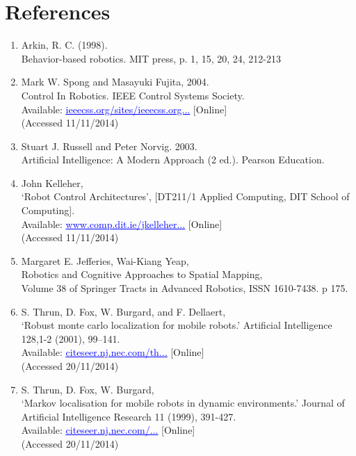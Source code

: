 \documentclass{article}
\begin{document}
\section{References}
\begin{enumerate}

\item Arkin, R. C. (1998).
\\Behavior-based robotics. MIT press, p. 1, 15, 20, 24, 212-213

\item Mark W. Spong and Masayuki Fujita, 2004.
\\Control In Robotics. IEEE Control Systems Society. \\Available: \href{ieeecss.org/sites/ieeecss.org/files/documents/IoCT-Part1-04Robotics.pdf}{\textcolor{blue}{\uline{ieeecss.org/sites/ieeecss.org...}}} [Online]
\\(Accessed 11/11/2014)

\item Stuart J. Russell and Peter Norvig. 2003.
\\Artificial Intelligence: A Modern Approach (2 ed.). Pearson Education.

\item John Kelleher,
\\‘Robot Control Architectures’,  [DT211/1 Applied Computing, DIT School of Computing].
\\Available: \href{www.comp.dit.ie/jkelleher/appliedcomputing/week8/RCA.pdf}{\textcolor{blue}{\uline{www.comp.dit.ie/jkelleher...}}} [Online]
\\(Accessed 11/11/2014)

\item Margaret E. Jefferies, Wai-Kiang Yeap,
\\Robotics and Cognitive Approaches to Spatial Mapping,
\\Volume 38 of Springer Tracts in Advanced Robotics, ISSN 1610-7438. p 175.

\item S. Thrun, D. Fox, W. Burgard, and F. Dellaert,
\\‘Robust monte carlo localization for mobile robots.’ Artificial Intelligence 128,1-2 (2001), 99–141.
\\Available: \href{citeseer.nj.nec.com/thrun01robust.html}{\textcolor{blue}{\uline{citeseer.nj.nec.com/th...}}} [Online]
\\(Accessed 20/11/2014)

\item S. Thrun, D. Fox, W. Burgard,
\\‘Markov localisation for mobile robots in dynamic environments.’ Journal of Artificial Intelligence Research 11 (1999), 391-427.
\\Available: \href{citeseer.nj.nec.com/fox99markov.html}{\textcolor{blue}{\uline{citeseer.nj.nec.com/...}}} [Online]
\\(Accessed 20/11/2014)


\end{enumerate}
\end{document}
